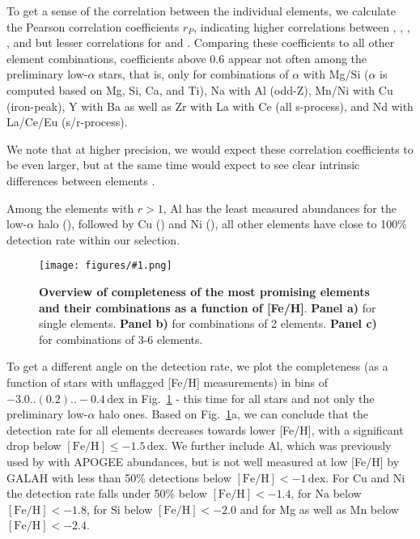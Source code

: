 \documentclass[fleqn,usenatbib]{mnras}
\newcommand{\dex}{\,\mathrm{dex}}	%
\newcommand{\codeicon}{{\faCloudDownload}}
\newcommand{\codelink}[1]{\href{https://github.com/svenbuder/buder_galah_accreted_chemistry/tree/main/figures/#1.ipynb}{\codeicon}\,\,}
\newcommand{\oscaption}[2]{\caption{#2 \codelink{#1}}}
\newcommand{\figurecolumnwidth}[3]{\begin{figure} \centering \texttt{[image: figures/\#1.png]}\oscaption{#2}{#3}\label{fig:#1} \end{figure}}
\begin{document}
To get a sense of the correlation between the individual elements, we calculate the Pearson correlation coefficients $r_P$, indicating higher correlations between , , , , and  but lesser correlations for  and . Comparing these coefficients to all other element combinations, coefficients above 0.6 appear not often among the preliminary low-$\alpha$ stars, that is, only for combinations of $\alpha$ with Mg/Si ($\alpha$ is computed based on Mg, Si, Ca, and Ti), Na with Al (odd-Z), Mn/Ni with Cu (iron-peak), Y with Ba as well as Zr with La with Ce (all s-process), and Nd with La/Ce/Eu (s/r-process).

We note that at higher precision, we would expect these correlation coefficients to be even larger, but at the same time would expect to see clear intrinsic differences between elements \citep[e.g.][]{Blancato2019, Ting2021}.

Among the elements with $r > 1$, Al has the least measured abundances for the low-$\alpha$ halo (), followed by Cu () and Ni (), all other elements have close to 100\% detection rate within our selection. 

\figurecolumnwidth{Completeness_Combinations}{gaussian_mixture_models}{
\textbf{Overview of completeness of the most promising elements and their combinations as a function of [Fe/H]}.
\textbf{Panel a)} for single elements.
\textbf{Panel b)} for combinations of 2 elements.
\textbf{Panel c)} for combinations of 3-6 elements.
}

To get a different angle on the detection rate, we plot the completeness (as a function of stars with unflagged [Fe/H] measurements) in bins of $-3.0..(0.2)..-0.4\,\mathrm{dex}$ in Fig.~\ref{fig:Completeness_Combinations} - this time for all stars and not only the preliminary low-$\alpha$ halo ones. Based on Fig.~\ref{fig:Completeness_Combinations}a, we can conclude that the detection rate for all elements decreases towards lower [Fe/H], with a significant drop below $\mathrm{[Fe/H]} \leq -1.5\dex$. We further include Al, which was previously used by \citet{Das2020} with APOGEE abundances, but is not well measured at low [Fe/H] by GALAH with less than 50\% detections below $\mathrm{[Fe/H]} < -1\dex$. For Cu and Ni the detection rate falls under 50\% below $\mathrm{[Fe/H]} < -1.4$, for Na below $\mathrm{[Fe/H]} < -1.8$, for Si below $\mathrm{[Fe/H]} < -2.0$ and for Mg as well as Mn below $\mathrm{[Fe/H]} < -2.4$.
\end{document}
